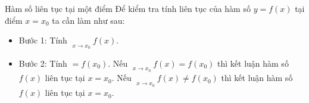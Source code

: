 \begin{dang}{Hàm số liên tục tại một điểm}
	Để kiểm tra tính liên tục của hàm số $y=f(x)$ tại điểm $x=x_0$ ta cần làm như sau:
	\begin{itemize}
		\item Bước 1: Tính $\mathop {\lim \limits_{n \to +\infty}}\limits_{x \to {x_0}} f\left( x \right).$
		\item Bước 2: Tính $= f\left( {{x_0}} \right).$
		Nếu $\mathop {\lim \limits_{n \to +\infty}}\limits_{x \to {x_0}} f\left( x \right) = f\left( {{x_0}} \right)$ thì kết luận hàm số $f(x)$ liên tục tại $x=x_0.$
		Nếu $\mathop {\lim \limits_{n \to +\infty}}\limits_{x \to {x_0}} f\left( x \right) \ne f\left( {{x_0}} \right)$ thì kết luận hàm số $f(x)$ liên tục tại $x=x_0.$
	\end{itemize}
\end{dang}
